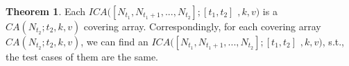 \documentclass[conference]{IEEEtran}
\theoremstyle{definition}
\newtheorem*{theorem}{Theorem}
\begin{document}
%
%
%
%


\begin{theorem}
Each $ICA([N_{t_{1}},N_{t_{1} + 1},...,N_{t_{2}}];[t_{1},t_{2}]$ $, k, v)$ is a $CA(N_{t_{2}}; t_{2}, k, v)$ covering array. Correspondingly, for each covering array $CA(N_{t_{2}}; t_{2}, k, v)$, we can find an $ICA([N_{t_{1}},N_{t_{1} + 1},...,N_{t_{2}}];[t_{1},t_{2}]$ $, k, v)$, s.t., the test cases of them are the same.
\end{theorem}
\end{document}
